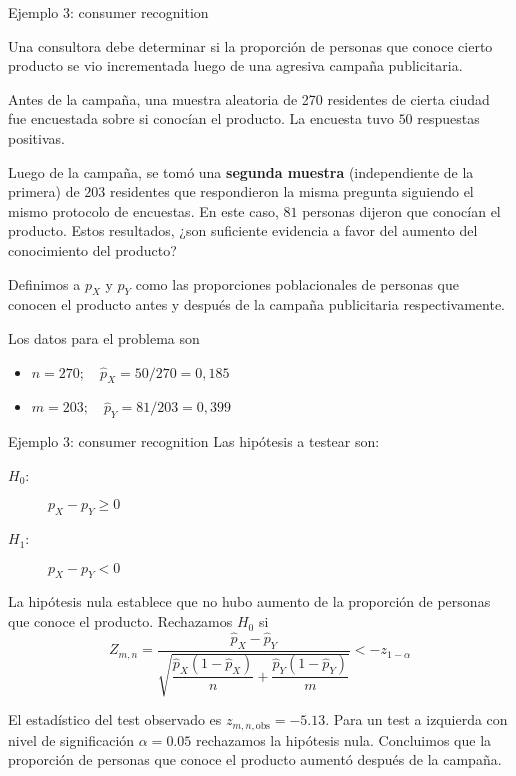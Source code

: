 \documentclass{beamer}
\theoremstyle{definition}
\begin{document}
\begin{frame}{\color{rosee} Ejemplo 3: consumer recognition}\small

   Una consultora debe determinar si la proporci\'on de personas que
   conoce cierto producto se vio incrementada luego de una agresiva
   campa\~na publicitaria.
   
   \medskip Antes de la campa\~na, una muestra aleatoria de 270
   residentes de cierta ciudad fue encuestada sobre si conoc\'ian el
   producto. La encuesta tuvo $50$ respuestas positivas.
   
   \medskip Luego de la campa\~na, se
   tom\'o una \textbf{segunda muestra} (independiente de la primera) de $203$ residentes que respondieron la
   misma pregunta siguiendo el mismo protocolo de encuestas. En este
   caso, $81$ personas dijeron que conoc\'ian el producto. Estos
   resultados, ¿son suficiente evidencia a favor del aumento del
   conocimiento del producto?
   
   \medskip Definimos a $p_X$ y $p_Y$ como las proporciones poblacionales de personas que conocen el producto antes y después de la campaña publicitaria respectivamente.
   \medskip
   
      Los datos para el problema son
   \begin{itemize}
   \item $n=270; \quad\widehat{p}_X=50/270=0,185$
   \item $m=203; \quad\widehat{p}_Y=81/203=0,399$
   \end{itemize}
 
\end{frame}

\begin{frame}{\color{rosee} Ejemplo 3: consumer recognition}\small
    Las hip\'otesis a testear son:
\begin{center}
   \begin{description}
   \item[$H_0$:] $p_X-p_Y \geq 0$
   \item[$H_1$:] $p_X-p_Y <0$
   \end{description}
   \end{center}
   La hip\'otesis nula establece que no hubo aumento de la proporci\'on de personas que conoce el producto. Rechazamos $H_0$ si
   \[Z_{m,n}=\dfrac{\widehat{p}_X-\widehat{p}_Y}{\sqrt{\dfrac{\widehat{p}_X(1-\widehat{p}_X)}{n}+
         \dfrac{\widehat{p}_Y(1-\widehat{p}_Y)}{m}}} < -z_{1-\alpha}\]

   El estad\'istico del test observado es $z_{m,n,\text{obs}}= -5.13$. Para un test a izquierda con nivel de significaci\'on
   $\alpha=0.05$ rechazamos la hip\'otesis nula. Concluimos que la
   proporci\'on de personas que conoce el producto aument\'o despu\'es
   de la campa\~na.
\end{frame}
\end{document}
